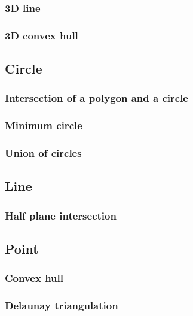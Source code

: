 \documentclass[titlepage,a4paper,10pt]{article}
\begin{document}
\begin{multicols}{2}
\begin{spacing}{0.8}
{				\subsubsection{3D line}
					
				\subsubsection{3D convex hull}
					
			\subsection{Circle}
				
				\subsubsection{Intersection of a polygon and a circle}
					
				\subsubsection{Minimum circle}
					
				\subsubsection{Union of circles}
					
			\subsection{Line}
				
				\subsubsection{Half plane intersection}
					
			\subsection{Point}
				
				\subsubsection{Convex hull}
					
				\subsubsection{Delaunay triangulation}
					
}
\end{spacing}
\end{multicols}
\end{document}
